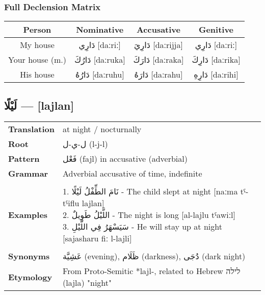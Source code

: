 \documentclass[letter,12pt]{article}
\begin{document}
\subsubsection*{Full Declension Matrix}
\begin{tabular}{|c|c|c|c|}
\hline
\textbf{Person} & \textbf{Nominative} & \textbf{Accusative} & \textbf{Genitive} \\
\hline
My house & \textarabic{دَارِي} [daːriː] & \textarabic{دَارِيَ} [daːrijja] & \textarabic{دَارِي} [daːriː] \\
\hline
Your house (m.) & \textarabic{دَارُكَ} [daːruka] & \textarabic{دَارَكَ} [daːraka] & \textarabic{دَارِكَ} [daːrika] \\
\hline
His house & \textarabic{دَارُهُ} [daːruhu] & \textarabic{دَارَهُ} [daːrahu] & \textarabic{دَارِهِ} [daːrihi] \\
\hline
\end{tabular}

\subsection{\textarabic{لَيْلًا} — [lajlan]}
\begin{tabular}{p{3cm}p{10cm}}
\toprule
\textbf{Translation} & at night / nocturnally \\
\textbf{Root} & \textarabic{ل-ي-ل} (l-j-l) \\
\textbf{Pattern} & \textarabic{فَعْل} (fajl) in accusative (adverbial) \\
\textbf{Grammar} & Adverbial accusative of time, indefinite \\
\midrule \\
\textbf{Examples} & \makecell[l]{\parbox{9.5cm}{
1. \textarabic{نَامَ الطِّفْلُ لَيْلًا} - The child slept at night [naːma tˤ-tˤiflu lajlan]\\
2. \textarabic{اللَّيْلُ طَوِيلٌ} - The night is long [al-lajlu tˤawiːl]\\
3. \textarabic{سَيَسْهَرُ فِي اللَّيْلِ} - He will stay up at night [sajasharu fiː l-lajli]
}} \\
\midrule \\
\textbf{Synonyms} & \textarabic{عَشِيَّة} (evening), \textarabic{ظَلَام} (darkness), \textarabic{دُجَى} (dark night) \\
\textbf{Etymology} & From Proto-Semitic *lajl-, related to Hebrew \texthebrew{לילה} (lajla) "night" \\
\bottomrule
\end{tabular}
\end{document}
